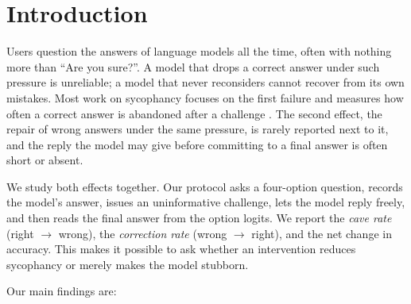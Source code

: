 \section{Introduction}

Users question the answers of language models all the time, often with nothing more than ``Are you sure?''. A model that drops a correct answer under such pressure is unreliable; a model that never reconsiders cannot recover from its own mistakes. Most work on sycophancy focuses on the first failure and measures how often a correct answer is abandoned after a challenge \citep{laban2023flipflop,sharma2023sycophancy}. The second effect, the repair of wrong answers under the same pressure, is rarely reported next to it, and the reply the model may give before committing to a final answer is often short or absent.

We study both effects together. Our protocol asks a four-option question, records the model's answer, issues an uninformative challenge, lets the model reply freely, and then reads the final answer from the option logits. We report the \emph{cave rate} (right $\to$ wrong), the \emph{correction rate} (wrong $\to$ right), and the net change in accuracy. This makes it possible to ask whether an intervention reduces sycophancy or merely makes the model stubborn.

Our main findings are:

